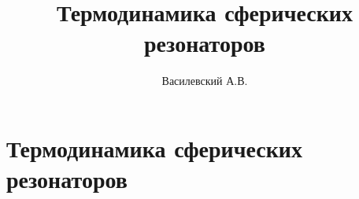 \documentclass[12pt,a4paper]{article}
\title{Термодинамика сферических резонаторов}
\author{Василевский А.В.}
\begin{document}
    \maketitle
    \tableofcontents

    \section{Термодинамика сферических резонаторов}

    \appendix

    \nocite{*}
    
    
\end{document}
